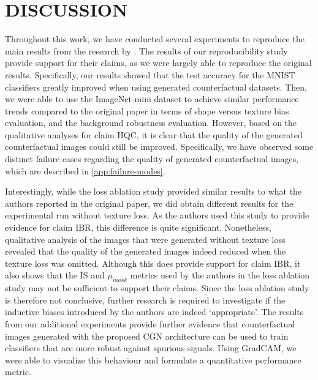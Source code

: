 \section{DISCUSSION} \label{sec:discussion}
Throughout this work, we have conducted several experiments to reproduce the main results from the research by . The results of our reproducibility study provide support for their claims, as we were largely able to reproduce the original results. Specifically, our results showed that the test accuracy for the MNIST classifiers greatly improved when using generated counterfactual datasets. Then, we were able to use the ImageNet-mini dataset to achieve similar performance trends compared to the original paper in terms of shape versus texture bias evaluation, and the background robustness evaluation. However, based on the qualitative analyses for claim HQC, it is clear that the quality of the generated counterfactual images could still be improved. Specifically, we have observed some distinct failure cases regarding the quality of generated counterfactual images, which are described in \cref{app:failure-modes}.

Interestingly, while the loss ablation study provided similar results to what the authors reported in the original paper, we did obtain different results for the experimental run without texture loss. As the authors used this study to provide evidence for claim IBR, this difference is quite significant. Nonetheless, qualitative analysis of the images that were generated without texture loss revealed that the quality of the generated images indeed reduced when the texture loss was omitted. Although this does provide support for claim IBR, it also shows that the IS and $\mu_{mask}$ metrics used by the authors in the loss ablation study may not be sufficient to support their claims. Since the loss ablation study is therefore not conclusive, further research is required to investigate if the inductive biases introduced by the authors are indeed `appropriate'. The results from our additional experiments provide further evidence that counterfactual images generated with the proposed CGN architecture can be used to train classifiers that are more robust against spurious signals. Using GradCAM, we were able to visualize this behaviour and formulate a quantitative performance metric. 

